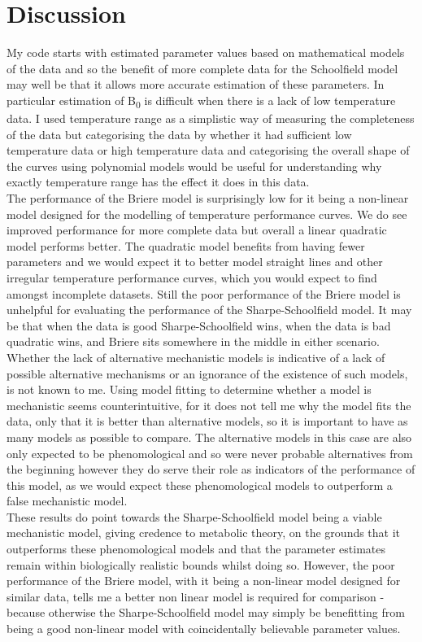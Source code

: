 \documentclass[12pt]{article}
\begin{document}
  \section{Discussion}

  My code starts with estimated parameter values based on mathematical models of the data and 
  so the benefit of more complete data for the Schoolfield model may well be that it allows more 
  accurate estimation of these parameters. In particular estimation of B\textsubscript{0} is 
  difficult when there is a lack of low temperature data. I used temperature range as a simplistic way of measuring
  the completeness of the data but categorising the data by whether it had sufficient low temperature data or high temperature data 
  and categorising the overall shape of the curves using polynomial models would be useful for understanding why exactly temperature 
  range has the effect it does in this data.\\
  The performance of the Briere model is surprisingly low for it being a non-linear model designed
  for the modelling of temperature performance curves. We do see improved performance for more complete data but overall 
  a linear quadratic model performs better. The quadratic model benefits from having fewer parameters and 
  we would expect it to better model straight lines and other irregular temperature performance curves, 
  which you would expect to find amongst incomplete datasets. Still the poor performance of the Briere model is unhelpful for evaluating the performance of the 
  Sharpe-Schoolfield model. It may be that when the data is good Sharpe-Schoolfield wins, when the data is bad quadratic wins, 
  and Briere sits somewhere in the middle in either scenario.\\
  Whether the lack of alternative mechanistic models is indicative of a lack of possible alternative mechanisms 
  or an ignorance of the existence of such models, is not known to me. Using model fitting to determine whether a 
  model is mechanistic seems counterintuitive, for it does not tell me why the model fits the data, only that 
  it is better than alternative models, so it is important to have as many models as possible to compare. The alternative models 
  in this case are also only expected to be phenomological
  and so were never probable alternatives from the beginning however they do serve their role as indicators of the 
  performance of this model, as we would expect these phenomological models to outperform a false mechanistic model.\\
  These results do point towards the Sharpe-Schoolfield model being a viable mechanistic model, giving credence
  to metabolic theory, on the grounds that it outperforms 
  these phenomological models and that the parameter estimates remain within biologically realistic bounds whilst doing so. 
  However, the poor performance of the Briere model, with it being a non-linear 
  model designed for similar data, tells me a better non linear model is required for comparison - because otherwise 
  the Sharpe-Schoolfield model may simply be benefitting from being a good non-linear model with coincidentally believable 
  parameter values. 


  
  
\end{document}
